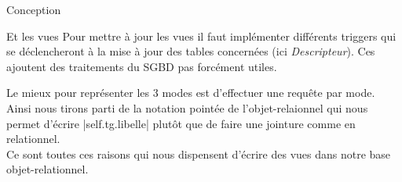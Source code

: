 \documentclass[a4paper, 12pt]{report}
\begin{document}
\begin{chapter}{Conception}
\begin{section}{Et les vues}
		Pour mettre à jour les vues il faut implémenter différents triggers qui se déclencheront à la mise à jour des tables concernées (ici \emph{Descripteur}).
		Ces ajoutent des traitements du SGBD  pas forcément utiles.

		Le mieux pour représenter les 3 modes est d'effectuer 
		une requête par mode. Ainsi nous tirons parti de la notation pointée de l'objet-relaionnel 
		qui nous permet d'écrire |self.tg.libelle| plutôt que de faire une jointure comme en relationnel.\\

		Ce sont toutes ces raisons qui nous dispensent d'écrire des vues dans notre base objet-relationnel.

	\end{section}
\end{chapter}
\end{document}
